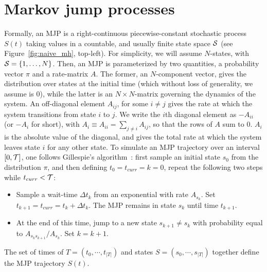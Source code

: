 \section{Markov jump processes}
Formally, an MJP is a right-continuous piecewise-constant stochastic
process $S(t)$ taking values in a countable, and usually finite state
space ${\mathcal S}$ (see Figure~\ref{fig:naive_mh}, top-left).
For simplicity, we will assume $N$-states, with ${\mathcal S} = \{1,\ldots,N\}$. Then, 
an MJP is parameterized by two quantities, a probability vector $\pi$ and a 
rate-matrix $A$. The former, an $N$-component vector, gives the 
distribution over states at the initial time (which without loss of 
generality, we assume is $0$), while the latter is an 
$N \times N$-matrix governing the dynamics of the system.  An 
off-diagonal element $A_{ij}$, for some $i \neq j$ gives the rate at 
which the system transitions from state $i$ to $j$. We write the 
$i$th diagonal element as $-A_{ii}$ (or $-A_i$ for short), with
$A_i \equiv A_{ii} = \sum_{j \neq i} A_{ij}$, 
so that the rows of $A$ sum to $0$.  $A_i$ is the absolute value of the diagonal,
and gives the total rate at which the system leaves state $i$ for any other state.
To simulate an MJP trajectory over an interval $[0,{\mathcal T}]$, one follows 
Gillespie's algorithm~\cite{gillespie97}: 
first sample an initial state $s_0$ from the distribution $\pi$, and
then defining $t_0 = t_{curr} = k = 0$, repeat the following two steps while
$t_{curr} < {\mathcal T}$:
\begin{itemize}
  \item Sample a wait-time $\Delta t_k$ from an exponential with rate $A_{s_k}$. 
    Set $t_{k+1} = t_{curr} = t_{k} + \Delta t_k$.
    The MJP remains in state $s_k$ until time $t_{k+1}$.
  \item At the end of this time, jump to a new state $s_{k+1} \neq s_k$ with 
    probability equal to $A_{s_ks_{k+1}}/A_{s_k}$. Set $k=k+1$.
\end{itemize}
The set of times of $T=(t_0, \cdots, t_{|T|})$ and states 
$S=(s_0, \cdots, s_{|T|})$ together define the MJP trajectory $S(t)$.

